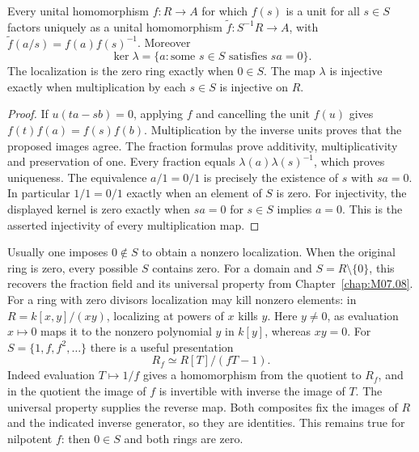 \begin{proposition}\label{prop:localization-universal}
Every unital homomorphism $f:R\to A$ for which $f(s)$ is a unit for
all $s\in S$ factors uniquely as a unital homomorphism
$\widetilde f:S^{-1}R\to A$, with
$\widetilde f(a/s)=f(a)f(s)^{-1}$. Moreover
\[
 \ker\lambda=\{a:\text{some }s\in S\text{ satisfies }sa=0\}.
\]
The localization is the zero ring exactly when $0\in S$.
The map $\lambda$ is injective exactly when multiplication by each
$s\in S$ is injective on $R$.
\end{proposition}
\begin{proof}
If $u(ta-sb)=0$, applying $f$ and cancelling the unit $f(u)$ gives
$f(t)f(a)=f(s)f(b)$. Multiplication by the inverse units proves that
the proposed images agree. The fraction formulas prove additivity,
multiplicativity and preservation of one. Every fraction equals
$\lambda(a)\lambda(s)^{-1}$, which proves uniqueness.
The equivalence $a/1=0/1$ is precisely the existence of $s$ with $sa=0$.
In particular $1/1=0/1$ exactly when an element of $S$ is zero.
For injectivity, the displayed kernel is zero exactly when
$sa=0$ for $s\in S$ implies $a=0$. This is the asserted injectivity
of every multiplication map.
\end{proof}
Usually one imposes $0\notin S$ to obtain a nonzero localization.
When the original ring is zero, every possible $S$ contains zero.
For a domain and $S=R\setminus\{0\}$, this recovers the fraction field
and its universal property from Chapter~\ref{chap:M07.08}.
For a ring with zero divisors localization may kill nonzero elements:
in $R=k[x,y]/(xy)$, localizing at powers of $x$ kills $y$.
Here $y\ne0$, as evaluation $x\mapsto0$ maps it to the nonzero
polynomial $y$ in $k[y]$, whereas $xy=0$.
For $S=\{1,f,f^2,\ldots\}$ there is a useful presentation
\[
 R_f\simeq R[T]/(fT-1).
\]
Indeed evaluation $T\mapsto1/f$ gives a homomorphism from the quotient
to $R_f$, and in the quotient the image of $f$ is invertible with inverse
the image of $T$. The universal property supplies the reverse map.
Both composites fix the images of $R$ and the indicated inverse
generator, so they are identities. This remains true for nilpotent $f$:
then $0\in S$ and both rings are zero.

